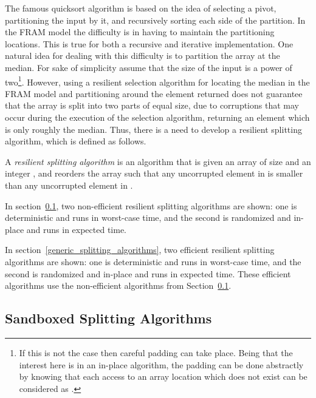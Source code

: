 \documentclass{llncs}
\begin{document}
The famous quicksort algorithm is based on the idea of selecting a pivot, partitioning the input by it, and recursively sorting each side of the partition. In the FRAM model the difficulty is in having to maintain the  partitioning locations. This is true for both a recursive and iterative implementation. One natural idea for dealing with this difficulty is to partition the array at the median. For sake of simplicity assume that the size of the input is a power of two\footnote{If this is not the case then careful padding can take place. Being that the interest here is in an in-place algorithm, the padding can be done abstractly by knowing that each access to an array location which does not exist can be considered as .}. However, using a resilient selection algorithm for locating the median in the FRAM model and partitioning around the element returned does not guarantee that the array is split into two parts of equal size, due to corruptions that may occur during the execution of the selection algorithm, returning an element which is only roughly the median. Thus, there is a need to develop a resilient splitting algorithm, which is defined as follows.

\begin{definition}
A \emph{resilient splitting algorithm} is an algorithm that is given an array  of size  and an integer , and reorders the array such that any uncorrupted element in  is smaller than any uncorrupted element in .
\end{definition}

In section~\ref{sandboxed_splitting_algorithms}, two non-efficient resilient splitting algorithms are shown: one is deterministic and runs in  worst-case time, and the second is randomized and in-place and runs in  expected time.

In section~\ref{generic_splitting_algorithms}, two efficient resilient splitting algorithms are shown: one is deterministic and runs in  worst-case time, and the second is randomized and in-place and runs in  expected time. These efficient algorithms use the non-efficient algorithms from Section~\ref{sandboxed_splitting_algorithms}.











\subsection{Sandboxed Splitting Algorithms}
\label{sandboxed_splitting_algorithms}
\end{document}
